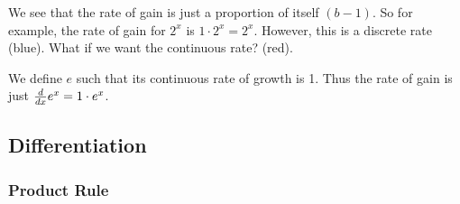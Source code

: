 \documentclass[12pt]{article}
\begin{document}
We see that the rate of gain is just a proportion of itself \( (b - 1) \).
So for example, the rate of gain for \( 2^x \) is \( 1 \cdot 2^x = 2^x \).
However, this is a discrete rate (blue).
What if we want the continuous rate? (red).

We define \( e \) such that its continuous rate of growth is 1.
Thus the rate of gain is just \( \dv{x} e^x = 1 \cdot e^x \).

\newpage
\subsection{Differentiation}

\subsubsection{Product Rule}
\end{document}
